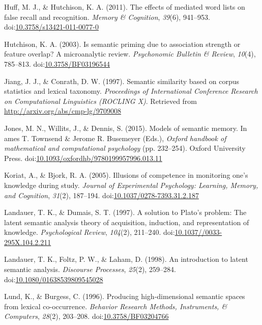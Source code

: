 \documentclass[english,,man]{apa6}
\begin{document}
\leavevmode\hypertarget{ref-Huff2011}{}%
Huff, M. J., \& Hutchison, K. A. (2011). The effects of mediated word lists on false recall and recognition. \emph{Memory \& Cognition}, \emph{39}(6), 941--953. doi:\href{https://doi.org/10.3758/s13421-011-0077-0}{10.3758/s13421-011-0077-0}

\leavevmode\hypertarget{ref-Hutchison2003}{}%
Hutchison, K. A. (2003). Is semantic priming due to association strength or feature overlap? A microanalytic review. \emph{Psychonomic Bulletin \& Review}, \emph{10}(4), 785--813. doi:\href{https://doi.org/10.3758/BF03196544}{10.3758/BF03196544}

\leavevmode\hypertarget{ref-Jiang1997}{}%
Jiang, J. J., \& Conrath, D. W. (1997). Semantic similarity based on corpus statistics and lexical taxonomy. \emph{Proceedings of International Conference Research on Computational Linguistics (ROCLING X)}. Retrieved from \url{http://arxiv.org/abs/cmp-lg/9709008}

\leavevmode\hypertarget{ref-Jones2015}{}%
Jones, M. N., Willits, J., \& Dennis, S. (2015). Models of semantic memory. In ames T. Townsend \& Jerome R. Busemeyer (Eds.), \emph{Oxford handbook of mathematical and computational psychology} (pp. 232--254). Oxford University Press. doi:\href{https://doi.org/10.1093/oxfordhb/9780199957996.013.11}{10.1093/oxfordhb/9780199957996.013.11}

\leavevmode\hypertarget{ref-Koriat2005}{}%
Koriat, A., \& Bjork, R. A. (2005). Illusions of competence in monitoring one's knowledge during study. \emph{Journal of Experimental Psychology: Learning, Memory, and Cognition}, \emph{31}(2), 187--194. doi:\href{https://doi.org/10.1037/0278-7393.31.2.187}{10.1037/0278-7393.31.2.187}

\leavevmode\hypertarget{ref-Landauer1997}{}%
Landauer, T. K., \& Dumais, S. T. (1997). A solution to Plato's problem: The latent semantic analysis theory of acquisition, induction, and representation of knowledge. \emph{Psychological Review}, \emph{104}(2), 211--240. doi:\href{https://doi.org/10.1037//0033-295X.104.2.211}{10.1037//0033-295X.104.2.211}

\leavevmode\hypertarget{ref-Landauer1998}{}%
Landauer, T. K., Foltz, P. W., \& Laham, D. (1998). An introduction to latent semantic analysis. \emph{Discourse Processes}, \emph{25}(2), 259--284. doi:\href{https://doi.org/10.1080/01638539809545028}{10.1080/01638539809545028}

\leavevmode\hypertarget{ref-Lund1996}{}%
Lund, K., \& Burgess, C. (1996). Producing high-dimensional semantic spaces from lexical co-occurrence. \emph{Behavior Research Methods, Instruments, \& Computers}, \emph{28}(2), 203--208. doi:\href{https://doi.org/10.3758/BF03204766}{10.3758/BF03204766}
\end{document}
